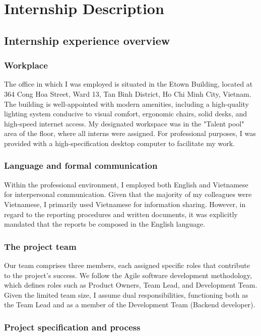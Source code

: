\section{Internship Description}

\subsection{Internship experience overview}

    \subsubsection{Workplace}
    The office in which I was employed is situated in the Etown Building, located at 364 Cong Hoa Street, Ward 13, Tan Binh District, Ho Chi Minh City, Vietnam. The building is well-appointed with modern amenities, including a high-quality lighting system conducive to visual comfort, ergonomic chairs, solid desks, and high-speed internet access. My designated workspace was in the "Talent pool" area of the floor, where all interns were assigned. For professional purposes, I was provided with a high-specification desktop computer to facilitate my work.

        
    \subsubsection{Language and formal communication}
    Within the professional environment, I employed both English and Vietnamese for interpersonal communication. Given that the majority of my colleagues were Vietnamese, I primarily used Vietnamese for information sharing. However, in regard to the reporting procedures and written documents, it was explicitly mandated that the reports be composed in the English language.
    
    \subsubsection{The project team}
    Our team comprises three members, each assigned specific roles that contribute to the project's success. We follow the Agile software development methodology, which defines roles such as Product Owners, Team Lead, and Development Team. Given the limited team size, I assume dual responsibilities, functioning both as the Team Lead and as a member of the Development Team (Backend developer).

    \subsubsection{Project specification and process}
    
